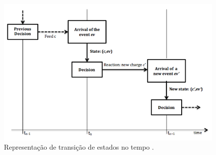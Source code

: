 \begin{frame}
  \begin{figure}[h]
  	\begin{center}
      \includegraphics [scale=0.3]{./Figures/StateTransitions}
      \caption {Representação de transição de estados no tempo
      \cite{green-markov}.}
  		\label{fig:arq-imuno}
  	\end{center}
  \end{figure}
\end{frame}





